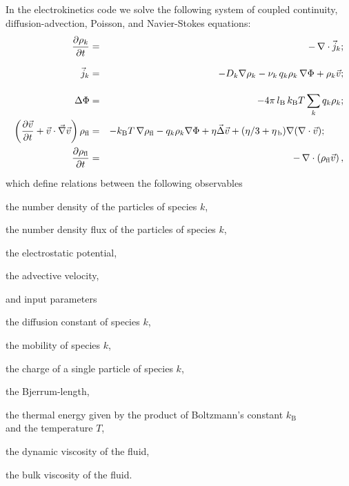 In the electrokinetics code we solve the following system of coupled continuity,
diffusion-advection, Poisson, and Navier-Stokes equations:
\begin{eqnarray}
\label{eq:ek-model-continuity} \frac{\partial \rho_k}{\partial t} & = & -\, \nabla \cdot \vec{j}_k \vphantom{\left(\frac{\partial}{\partial}\right)}; \\
\label{eq:ek-model-fluxes} \vec{j}_{k} & = & -D_k \nabla \rho_k - \nu_k \, q_k \rho_k\, \nabla \Phi + \rho_k \vec{v} \vphantom{\left(\frac{\partial}{\partial}\right)}; \\
\label{eq:ek-model-poisson} \Delta \Phi & = & -4 \pi \, \lb \, \kT \sum_k q_k \rho_k \vphantom{\left(\frac{\partial}{\partial}\right)}; \\
\label{eq:ek-model-velocity} \left(\frac{\partial \vec{v}}{\partial t} + \vec{v} \cdot \vec{\nabla} \vec{v} \right) \rho_\text{fl} & = & -\kT \, \nabla \rho_\text{fl} - q_k \rho_k \nabla \Phi + \eta \vec{\Delta} \vec{v} + (\eta / 3 + \eta_{\text{\,b}}) \nabla (\nabla \cdot \vec{v}); \qquad \\
\label{eq:ek-model-continuity-fl} \frac{\partial \rho_\text{fl}}{\partial t} & = & -\,\nabla\cdot\left( \rho_\text{fl} \vec{v} \right) \vphantom{\left(\frac{\partial}{\partial}\right)}, 
\end{eqnarray}
which define relations between the following observables
\begin{description}[itemsep=0cm,labelindent=1.5em,leftmargin=4.5em,style=nextline]
  \item[$\rho_k$] the number density of the particles of species $k$,
  \item[$\vec{j}_k$] the number density flux of the particles of species $k$,
  \item[$\Phi$] the electrostatic potential,
  \item[$\vec{v}$] the advective velocity,
\end{description}
and input parameters
\begin{description}[itemsep=0cm,labelindent=1.5em,leftmargin=4.5em,style=nextline]
  \item[$D_k$] the diffusion constant of species $k$,
  \item[$\nu_k$] the mobility of species $k$,
  \item[$q_k$] the charge of a single particle of species $k$,
  \item[$\lb$] the Bjerrum-length,
  \item[$\kT$] the thermal energy given by the product of Boltzmann's constant
  $k_\text{B}$\\and the temperature $T$,
  \item[$\eta$] the dynamic viscosity of the fluid,
  \item[$\eta_{\text{\,b}}$] the bulk viscosity of the fluid.
\end{description}
